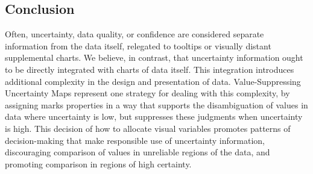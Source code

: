 \documentclass{vgtc}                          %
\begin{document}
\subsection{Conclusion}

Often, uncertainty, data quality, or confidence are considered separate information from the data itself, relegated to tooltips or visually distant supplemental charts. We believe, in contrast, that uncertainty information ought to be directly integrated with charts of data itself. This integration introduces additional complexity in the design and presentation of data. Value-Suppressing Uncertainty Maps represent one strategy for dealing with this complexity, by assigning marks properties in a way that supports the disambiguation of values in data where uncertainty is low, but suppresses these judgments when uncertainty is high. This decision of how to allocate visual variables promotes patterns of decision-making that make responsible use of uncertainty information, discouraging comparison of values in unreliable regions of the data, and promoting comparison in regions of high certainty.


%

%
%
%


\end{document}
